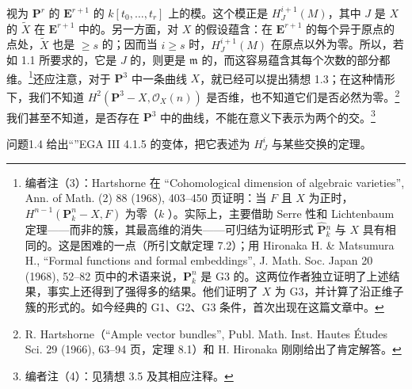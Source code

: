 视为 $\mathbf P^r$ 的 $\mathbf E^{r+1}$ 的 $k[t_0,\ldots,t_r]$ 上的模。这个模正是 $H^{i+1}_J(M)$，其中 $J$ 是 $X$ 的 $\widetilde X$ 在 $\mathbf E^{r+1}$ 中的。另一方面，对 $X$ 的假设蕴含：在 $\mathbf E^{r+1}$ 的每个异于原点的点处，$\widetilde X$ 也是 $\geq s$ 的；因而当 $i\geq s$ 时，$H^{i+1}_J(M)$ 在原点以外为零。所以，若如 1.1 所要求的，它是 $J$ 的，则更是 $\mathfrak m$ 的，而这容易蕴含其每个次数的部分都维。\footnote{编者注（3）：Hartshorne 在 “Cohomological dimension of algebraic varieties”, Ann. of Math. (2) 88 (1968), 403--450 页证明：当 $F$ 且 $X$ 为正时， $H^{n-1}(\mathbf P^n_k-X,F)$ 为零（$k$ ）。实际上，主要借助 Serre 性和 Lichtenbaum 定理——而非的簇，其最高维的消失——可归结为证明形式 $\widehat{\mathbf P}{}^n_k$ 与 $X$ 具有相同的。这是困难的一点（所引文献定理 7.2）；用 Hironaka H. \& Matsumura H., “Formal functions and formal embeddings”, J. Math. Soc. Japan 20 (1968), 52--82 页中的术语来说，$\mathbf P^n_k$ 是 G3 的。这两位作者独立证明了上述结果，事实上还得到了强得多的结果。他们证明了 $X$ 为 G3，并计算了沿正维子簇的形式的。如今经典的 G1、G2、G3 条件，首次出现在这篇文章中。}还应注意，对于 $\mathbf P^3$ 中一条曲线 $X$，就已经可以提出猜想 1.3；在这种情形下，我们不知道 $H^2(\mathbf P^3-X,\mathcal O_X(n))$
是否维，也不知道它们是否必然为零。\footnote{R. Hartshorne（“Ample vector bundles”, Publ. Math. Inst. Hautes Études Sci. 29 (1966), 63--94 页，定理 8.1）和 H. Hironaka 刚刚给出了肯定解答。}我们甚至不知道，是否存在 $\mathbf P^3$ 中的曲线，不能在意义下表示为两个的交。\footnote{编者注（4）：见猜想 3.5 及其相应注释。}

\begin{SGAresult}{问题}{1.4}
给出“”EGA III 4.1.5 的变体，把它表述为 $H^i_J$ 与某些交换的定理。
\end{SGAresult}

